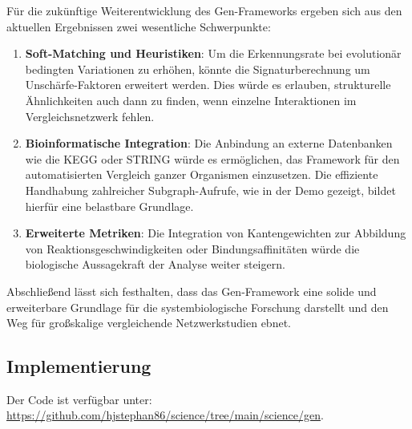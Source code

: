 ﻿\documentclass[a4paper,12pt]{article}
\theoremstyle{definition}
\begin{document}
Für die zukünftige Weiterentwicklung des Gen-Frameworks ergeben sich aus den aktuellen Ergebnissen zwei wesentliche Schwerpunkte:

\begin{enumerate}
	\item \textbf{Soft-Matching und Heuristiken}: Um die Erkennungsrate bei evolutionär bedingten Variationen zu erhöhen, könnte die Signaturberechnung um Unschärfe-Faktoren erweitert werden. Dies würde es erlauben, strukturelle Ähnlichkeiten auch dann zu finden, wenn einzelne Interaktionen im Vergleichsnetzwerk fehlen.
	\item \textbf{Bioinformatische Integration}: Die Anbindung an externe Datenbanken wie die KEGG oder STRING würde es ermöglichen, das Framework für den automatisierten Vergleich ganzer Organismen einzusetzen. Die effiziente Handhabung zahlreicher Subgraph-Aufrufe, wie in der Demo gezeigt, bildet hierfür eine belastbare Grundlage.
	\item \textbf{Erweiterte Metriken}: Die Integration von Kantengewichten zur Abbildung von Reaktionsgeschwindigkeiten oder Bindungsaffinitäten würde die biologische Aussagekraft der Analyse weiter steigern.
\end{enumerate}

Abschließend lässt sich festhalten, dass das Gen-Framework eine solide und erweiterbare Grundlage für die systembiologische Forschung darstellt und den Weg für großskalige vergleichende Netzwerkstudien ebnet.

\subsection{Implementierung}

Der Code ist verfügbar unter: \url{https://github.com/hjstephan86/science/tree/main/science/gen}.
\end{document}
